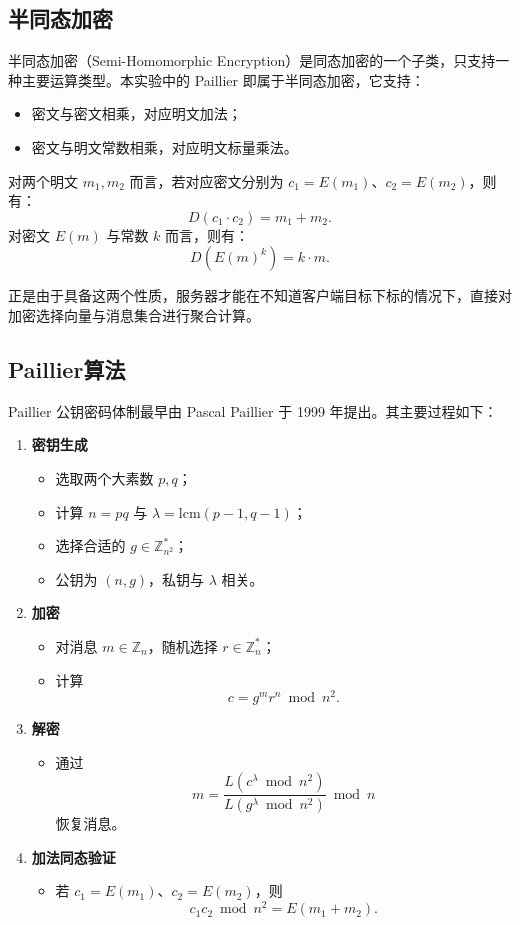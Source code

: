 \documentclass[UTF8,a4paper,10pt]{ctexart}
\begin{document}
\subsection{半同态加密}
半同态加密（Semi-Homomorphic Encryption）是同态加密的一个子类，只支持一种主要运算类型。本实验中的 Paillier 即属于半同态加密，它支持：
\begin{itemize}
    \item 密文与密文相乘，对应明文加法；
    \item 密文与明文常数相乘，对应明文标量乘法。
\end{itemize}

对两个明文 $m_1,m_2$ 而言，若对应密文分别为 $c_1=E(m_1)$、$c_2=E(m_2)$，则有：
\[
D(c_1 \cdot c_2)=m_1+m_2.
\]
对密文 $E(m)$ 与常数 $k$ 而言，则有：
\[
D(E(m)^k)=k \cdot m.
\]

正是由于具备这两个性质，服务器才能在不知道客户端目标下标的情况下，直接对加密选择向量与消息集合进行聚合计算。

\subsection{Paillier算法}
Paillier 公钥密码体制最早由 Pascal Paillier 于 1999 年提出。其主要过程如下：
\begin{enumerate}
    \item \textbf{密钥生成}
    \begin{itemize}
        \item 选取两个大素数 $p,q$；
        \item 计算 $n=pq$ 与 $\lambda=\mathrm{lcm}(p-1,q-1)$；
        \item 选择合适的 $g \in \mathbb{Z}_{n^2}^{*}$；
        \item 公钥为 $(n,g)$，私钥与 $\lambda$ 相关。
    \end{itemize}
    \item \textbf{加密}
    \begin{itemize}
        \item 对消息 $m \in \mathbb{Z}_n$，随机选择 $r \in \mathbb{Z}_n^*$；
        \item 计算
        \[
        c=g^m r^n \bmod n^2.
        \]
    \end{itemize}
    \item \textbf{解密}
    \begin{itemize}
        \item 通过
        \[
        m=\frac{L(c^\lambda \bmod n^2)}{L(g^\lambda \bmod n^2)} \bmod n
        \]
        恢复消息。
    \end{itemize}
    \item \textbf{加法同态验证}
    \begin{itemize}
        \item 若 $c_1=E(m_1)$、$c_2=E(m_2)$，则
        \[
        c_1c_2 \bmod n^2 = E(m_1+m_2).
        \]
    \end{itemize}
\end{enumerate}
\end{document}
